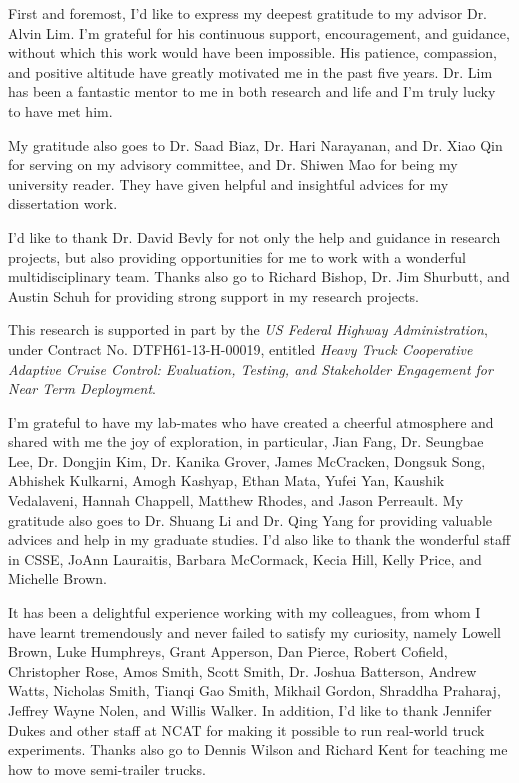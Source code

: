 \begin{acknowledgments}

  First and foremost, I'd like to express my deepest gratitude to my advisor Dr. Alvin Lim. I'm grateful for his continuous support, encouragement, and guidance, without which this work would have been impossible. His patience, compassion, and positive altitude have greatly motivated me in the past five years. Dr. Lim has been a fantastic mentor to me in both research and life and I'm truly lucky to have met him.

  My gratitude also goes to Dr. Saad Biaz, Dr. Hari Narayanan, and Dr. Xiao Qin for serving on my advisory committee, and Dr. Shiwen Mao for being my university reader. They have given helpful and insightful advices for my dissertation work.

  I'd like to thank Dr. David Bevly for not only the help and guidance in research projects, but also providing opportunities for me to work with a wonderful multidisciplinary team. Thanks also go to Richard Bishop, Dr. Jim Shurbutt, and Austin Schuh for providing strong support in my research projects.

   This research is supported in part by the \textit{US Federal Highway Administration}, under Contract No. DTFH61-13-H-00019, entitled \textit{Heavy Truck Cooperative Adaptive Cruise Control: Evaluation, Testing, and Stakeholder Engagement for Near Term Deployment}.

  I'm grateful to have my lab-mates who have created a cheerful atmosphere and shared with me the joy of exploration, in particular, Jian Fang, Dr. Seungbae Lee, Dr. Dongjin Kim, Dr. Kanika Grover, James McCracken, Dongsuk Song, Abhishek Kulkarni, Amogh Kashyap, Ethan Mata, Yufei Yan, Kaushik Vedalaveni, Hannah Chappell, Matthew Rhodes, and Jason Perreault. My gratitude also goes to Dr. Shuang Li and Dr. Qing Yang for providing valuable advices and help in my graduate studies. I'd also like to thank the wonderful staff in CSSE, JoAnn Lauraitis, Barbara McCormack, Kecia Hill, Kelly Price, and Michelle Brown.

  It has been a delightful experience working with my colleagues, from whom I have learnt tremendously and never failed to satisfy my curiosity, namely Lowell Brown, Luke Humphreys, Grant Apperson, Dan Pierce, Robert Cofield, Christopher Rose, Amos Smith, Scott Smith, Dr. Joshua Batterson, Andrew Watts, Nicholas Smith, Tianqi Gao Smith, Mikhail Gordon, Shraddha Praharaj, Jeffrey Wayne Nolen, and Willis Walker. In addition, I'd like to thank Jennifer Dukes and other staff at NCAT for making it possible to run real-world truck experiments. Thanks also go to Dennis Wilson and Richard Kent for teaching me how to move semi-trailer trucks.


\end{acknowledgments}
